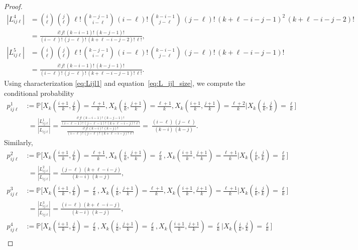 \documentclass[10pt,a4paper]{amsart}
\newcommand{\PP}{\mathbb{P}}
\begin{document}
\begin{proof}
\begin{align*}
   |L_{ij\ell}^4| &= \binom{i}{\ell} \, \binom{j}{\ell} \, \ell! \, \binom{k-j-1}{i-\ell} \, (i-\ell)! \, \binom{k-i-1}{j-\ell} \, (j-\ell)! \,(k+\ell-i-j-1)^2 \,(k+\ell-i-j-2)! \\ 
   &= \frac{i! \, j! \, (k-i-1)! \, (k-j-1)!}{(i-\ell)! \, (j-\ell)! \, (k+\ell-i-j-2)! \, \ell!}, \\ 
   |L_{ij\ell}^5| &= \binom{i}{\ell} \, \binom{j}{\ell} \, \ell! \, \binom{k-j-1}{i-\ell} \, (i-\ell)! \, \binom{k-i-1}{j-\ell} \, (j-\ell)! \,(k+\ell-i-j-1)! \\ 
   &= \frac{i! \, j! \, (k-i-1)! \, (k-j-1)!}{(i-\ell)! \, (j-\ell)! \, (k+\ell-i-j-1)! \, \ell!}.
\end{align*}
Using characterization \eqref{eq:Lijl1} and equation~\eqref{eq:L_ijl_size}, we compute the conditional probability
\begin{align*}
   p_{ij\ell}^1 &:=\PP\big[X_k(\tfrac{i+1}{k},\tfrac{j}{k}) = \tfrac{\ell+1}{k},  X_k(\tfrac{i}{k},\tfrac{j+1}{k}) = \tfrac{\ell+1}{k},  X_k(\tfrac{i+1}{k},\tfrac{j+1}{k}) = \tfrac{\ell+2}{k} \big| X_k(\tfrac{i}{k},\tfrac{j}{k}) = \tfrac{\ell}{k}\big] \\
   & \phantom{:}= \frac{|L_{ij\ell}^1|}{|L_{ij\ell}|} = \frac{\frac{i! \, j! \, (k-i-1)! \, (k-j-1)!}{(i-\ell-1)! \, (j-\ell-1)! \, (k+\ell-i-j)! \, \ell!}}{\frac{i! \, j! \, (k-i)! \, (k-j)!}{(i-\ell)! \, (j-\ell)! \, (k+\ell-i-j)! \, \ell!}} =\  \frac{(i-\ell) \, (j-\ell)}{(k-i) \, (k-j)}.
\end{align*}
Similarly,
\begin{align*}
   p_{ij\ell}^2 &:=\PP\big[X_k(\tfrac{i+1}{k},\tfrac{j}{k}) = \tfrac{\ell+1}{k},  X_k(\tfrac{i}{k},\tfrac{j+1}{k}) = \tfrac{\ell}{k}, X_k(\tfrac{i+1}{k},\tfrac{j+1}{k}) = \tfrac{\ell+1}{k} \big| X_k(\tfrac{i}{k},\tfrac{j}{k}) = \tfrac{\ell}{k}\big] \\
   & \phantom{:}= \frac{|L_{ij\ell}^2|}{|L_{ij\ell}|} = \frac{(j-\ell) \, (k+\ell-i-j)}{(k-i) \, (k-j)} , \\
   p_{ij\ell}^3 &:=\PP\big[X_k(\tfrac{i+1}{k},\tfrac{j}{k}) = \tfrac{\ell}{k},  X_k(\tfrac{i}{k},\tfrac{j+1}{k}) = \tfrac{\ell+1}{k},  X_k(\tfrac{i+1}{k},\tfrac{j+1}{k}) = \tfrac{\ell+1}{k} \big| X_k(\tfrac{i}{k},\tfrac{j}{k}) = \tfrac{\ell}{k}\big] \\
   & \phantom{:}= \frac{|L_{ij\ell}^3|}{|L_{ij\ell}|} = \frac{(i-\ell) \, (k+\ell-i-j)}{(k-i) \, (k-j)} , \\
   p_{ij\ell}^4 &:=\PP\big[X_k(\tfrac{i+1}{k},\tfrac{j}{k}) = \tfrac{\ell}{k},  X_k(\tfrac{i}{k},\tfrac{j+1}{k}) = \tfrac{\ell}{k},  X_k(\tfrac{i+1}{k},\tfrac{j+1}{k}) = \tfrac{\ell}{k} \big| X_k(\tfrac{i}{k},\tfrac{j}{k}) = \tfrac{\ell}{k}\big] \\

\end{align*}
\end{proof}
\end{document}
